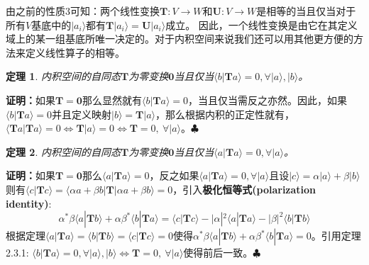 \documentclass[mathserif,hyperref,UTF8,openany,b5paper]{ctexbook}
\newtheorem{thm}{定理}[section]
\begin{document}
由之前的性质3可知：两个线性变换$\mathbf{T}: V\xrightarrow{}W$和$\mathbf{U}: V\xrightarrow{}W$是相等的当且仅当对于所有$V$基底中的$|a_i\rangle$都有$\mathbf{T}|a_i\rangle = \mathbf{U}|a_i\rangle$成立。
因此，一个线性变换是由它在其定义域上的某一组基底所唯一决定的。对于内积空间来说我们还可以用其他更方便的方法来定义线性算子的相等。
\begin{thm}
内积空间的自同态$\mathbf{T}$为零变换$\mathbf{0}$当且仅当$\langle b|\mathbf{T}a\rangle=0,\forall |a\rangle,|b\rangle$。
\end{thm}
\textbf{证明：}如果$\mathbf{T=0}$那么显然就有$\langle b|\mathbf{T}a\rangle=0$，当且仅当需反之亦然。因此，如果$\langle b|\mathbf{T}a\rangle=0$并且定义映射$|b\rangle=\mathbf{T}|a\rangle$，那么根据内积的正定性就有，$\langle \mathbf{T}a|\mathbf{T}a\rangle=0\Leftrightarrow\mathbf{T}|a\rangle=0\Leftrightarrow\mathbf{T}=0,\ \forall |a\rangle$。$\clubsuit$
\begin{thm}
内积空间的自同态$\mathbf{T}$为零变换$\mathbf{0}$当且仅当$\langle a|\mathbf{T}a\rangle=0,\forall |a\rangle$。
\end{thm}
\textbf{证明：}如果$\mathbf{T=0}$那么$\langle a|\mathbf{T}a\rangle=0$，反之如果$\langle a|\mathbf{T}a\rangle=0,\forall |a\rangle$且设$|c\rangle = \alpha|a\rangle+\beta|b\rangle$则有$\langle c|\mathbf{T}c\rangle=\langle \alpha a+\beta b|\mathbf{T}|\alpha a+\beta b\rangle=0$，引入\textbf{极化恒等式(polarization identity)}:
\begin{equation}
\alpha^*\beta\langle a|\mathbf{T}b\rangle+\alpha\beta^*\langle b|\mathbf{T}a\rangle=\langle c|\mathbf{T}c\rangle-|\alpha|^2\langle a|\mathbf{T}a\rangle-|\beta|^2\langle b|\mathbf{T}b\rangle
\end{equation}根据定理$\langle a|\mathbf{T}a\rangle=\langle b|\mathbf{T}b\rangle=\langle c|\mathbf{T}c\rangle=0$使得$\alpha^*\beta\langle a|\mathbf{T}b\rangle+\alpha\beta^*\langle b|\mathbf{T}a\rangle=0$。引用定理2.3.1: $\langle b|\mathbf{T}a\rangle=0,\forall |a\rangle,|b\rangle\Leftrightarrow\mathbf{T}=0,\ \forall |a\rangle$使得前后一致。$\clubsuit$
\end{document}
